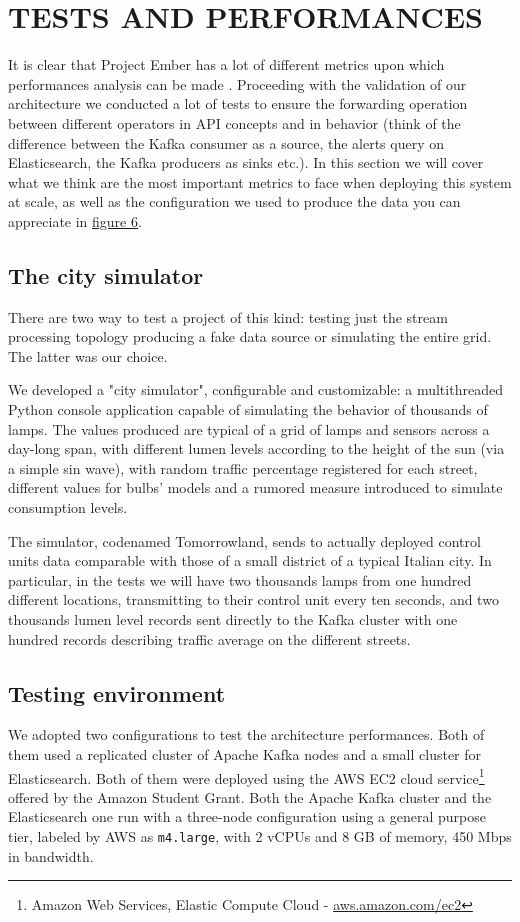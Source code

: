 \section{TESTS AND PERFORMANCES}
It is clear that Project Ember has a lot of different metrics upon which performances analysis can be made . Proceeding with the validation of our architecture we conducted a lot of tests to ensure the forwarding operation between different operators in API concepts and in behavior (think of the difference between the Kafka consumer as a source, the alerts query on Elasticsearch, the Kafka producers as sinks etc.). In this section we will cover what we think are the most important metrics to face when deploying this system at scale, as well as the configuration we used to produce the data you can appreciate in \hyperref[fig:ember_metrics]{figure 6}.

\subsection{The city simulator}
There are two way to test a project of this kind: testing just the stream processing topology producing a fake data source or simulating the entire grid. The latter was our choice.

We developed a "city simulator", configurable and customizable: a multithreaded Python console application capable of simulating the behavior of thousands of lamps. The values produced are typical of a grid of lamps and sensors across a day-long span, with different lumen levels according to the height of the sun (via a simple sin wave), with random traffic percentage registered for each street, different values for bulbs' models and a rumored measure introduced to simulate consumption levels.

The simulator, codenamed Tomorrowland, sends to actually deployed control units data comparable with those of a small district of a typical Italian city. In particular, in the tests we will have two thousands lamps from one hundred different locations, transmitting to their control unit every ten seconds, and two thousands lumen level records sent directly to the Kafka cluster with one hundred records describing traffic average on the different streets. 

\subsection{Testing environment}
We adopted two configurations to test the architecture performances. Both of them used a replicated cluster of Apache Kafka nodes and a small cluster for Elasticsearch. Both of them were deployed using the AWS EC2 cloud service\footnote{Amazon Web Services, Elastic Compute Cloud - \url{aws.amazon.com/ec2}} offered by the Amazon Student Grant. Both the Apache Kafka cluster and the Elasticsearch one run with a three-node configuration using a general purpose tier, labeled by AWS as \texttt{m4.large}, with 2 vCPUs and 8 GB of memory, 450 Mbps in bandwidth. 

